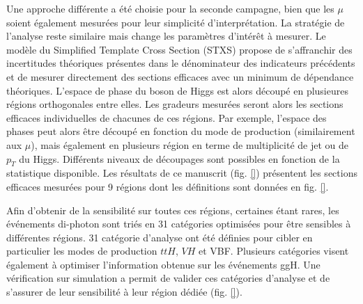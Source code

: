 Une approche différente a été choisie pour la seconde campagne, bien que les $\mu$ soient également mesurées pour leur simplicité d'interprétation.
La stratégie de l'analyse reste similaire mais change les paramètres d'intérêt à mesurer.
Le modèle du  Simplified Template Cross Section (STXS) propose de s'affranchir des incertitudes théoriques présentes dans le dénominateur des indicateurs précédents et de mesurer directement des sections efficaces avec un minimum de dépendance théoriques.
L'espace de phase du boson de Higgs est alors découpé en plusieures régions orthogonales entre elles.
Les gradeurs mesurées seront alors les sections efficaces individuelles de chacunes de ces régions.
Par exemple, l'espace des phases peut alors être découpé en fonction du mode de production (similairement aux $\mu$), mais également en plusieurs région en terme de multiplicité de jet ou de $p_T$ du Higgs.
Différents niveaux de découpages sont possibles en fonction de la statistique disponible.
Les résultats de ce manuscrit (fig. \ref{}) présentent les sections efficaces mesurées pour 9 régions dont les définitions sont données en fig. \ref{}.

Afin d'obtenir de la sensibilité sur toutes ces régions, certaines étant rares, les événements di-photon sont triés en 31 catégories optimisées pour être sensibles à différentes régions.
31 catégorie d'analyse ont été définies pour cibler en particulier les modes de production $ttH$, $VH$ et VBF.
Plusieurs catégories visent également à optimiser l'information obtenue sur les événements ggH.
Une vérification sur simulation a permit de valider ces catégories d'analyse et de s'assurer de leur sensibilité à leur région dédiée (fig. \ref{}).

